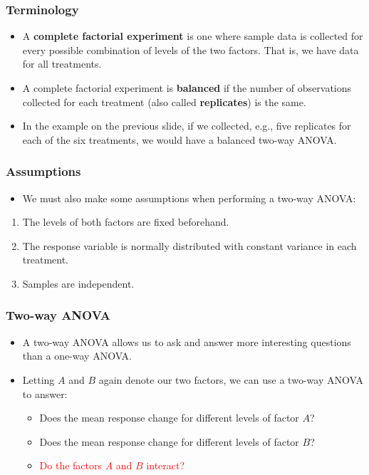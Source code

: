 \documentclass[12pt]{beamer}
\begin{document}
	\begin{frame}
		\frametitle{Terminology}
		
		\begin{itemize}[label={\color{blue}$\blacktriangleright$}]
			\item A \textbf{complete factorial experiment} is one where sample data is collected for every possible combination of levels of the two factors. That is, we have data for all treatments.
			
			\item A complete factorial experiment is \textbf{balanced} if the number of observations collected for each treatment (also called \textbf{replicates}) is the same.
			
			\item In the example on the previous slide, if we collected, e.g., five replicates for each of the six treatments, we would have a balanced two-way ANOVA.
		\end{itemize}
		
	\end{frame}
	\begin{frame}
		\frametitle{Assumptions}
		
		\begin{itemize}[label={\color{blue}$\blacktriangleright$}]
			\item We must also make some assumptions when performing a two-way ANOVA:
		\end{itemize}
		
		
		\begin{enumerate}[label=\textcolor{blue}{\arabic*.}]
			\item The levels of both factors are fixed beforehand.
			\item The response variable is normally distributed with constant variance in each treatment.
			\item Samples are independent.
		\end{enumerate}
		
	\end{frame}
	\begin{frame}
		\frametitle{Two-way ANOVA}
		
		\begin{itemize}[label={\color{blue}$\blacktriangleright$}]
			\item A two-way ANOVA allows us to ask and answer more interesting questions than a one-way ANOVA.
			\item Letting $A$ and $B$ again denote our two factors, we can use a two-way ANOVA to answer:
			\begin{itemize}[label={\color{blue}$\blacktriangleright$}]
				\item Does the mean response change for different levels of factor $A$?
				\item Does the mean response change for different levels of factor $B$?
				\item \textcolor{red}{Do the factors $A$ and $B$ interact?}
			\end{itemize}
		\end{itemize}
		
	\end{frame}
\end{document}
